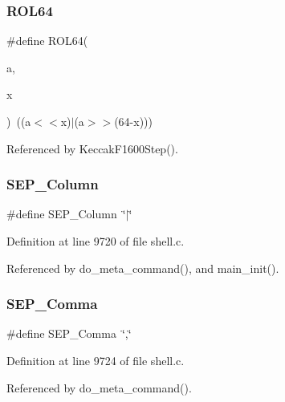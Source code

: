 \mbox{\label{shell_8c_aa6536b1f198fac5ccd4e3f1a33db7083}} 
\subsubsection{R\+O\+L64}
{\footnotesize\ttfamily \#define R\+O\+L64(\begin{DoxyParamCaption}\item[{}]{a,  }\item[{}]{x }\end{DoxyParamCaption})~((a$<$$<$x)$\vert$(a$>$$>$(64-\/x)))}



Referenced by Keccak\+F1600\+Step().

\mbox{\label{shell_8c_ae5958194097823abcaf38c3a9ae69eac}} 
\subsubsection{S\+E\+P\+\_\+\+Column}
{\footnotesize\ttfamily \#define S\+E\+P\+\_\+\+Column~\char`\"{}$\vert$\char`\"{}}



Definition at line 9720 of file shell.\+c.



Referenced by do\+\_\+meta\+\_\+command(), and main\+\_\+init().

\mbox{\label{shell_8c_a24436636aeb26425739a487e99cce5de}} 
\subsubsection{S\+E\+P\+\_\+\+Comma}
{\footnotesize\ttfamily \#define S\+E\+P\+\_\+\+Comma~\char`\"{},\char`\"{}}



Definition at line 9724 of file shell.\+c.



Referenced by do\+\_\+meta\+\_\+command().

\mbox{\label{shell_8c_ad9ef28878691c4e7b8a995eb22cd197b}} 
